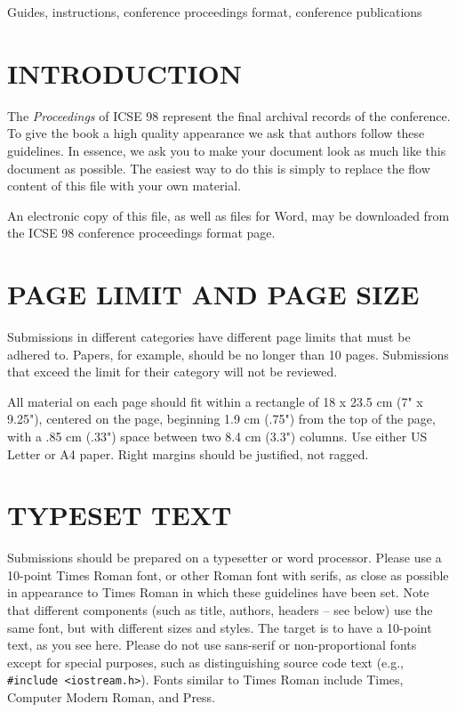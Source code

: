 \keywords
Guides, instructions, conference proceedings format, conference publications

\section{INTRODUCTION}
The {\it Proceedings} of ICSE 98 represent the final archival 
records of the conference. To give the book a high quality 
appearance we ask that authors follow these guidelines. In 
essence, we ask you to make your document look as much 
like this document as possible. The easiest way to do this is 
simply to replace the flow content of this file with your own 
material.
 
An electronic copy of this file, as well as files for Word,
 may be downloaded from the ICSE 98 conference proceedings
format page\cite{EAK}.

\section{PAGE LIMIT AND PAGE SIZE}
Submissions in different categories have different page 
limits that must be adhered to. Papers, for example, should 
be no longer than 10 pages. Submissions that exceed the 
limit for their category will not be reviewed.
 
All material on each page should fit within a rectangle of 
18 x 23.5 cm (7" x 9.25"), centered on the page, beginning 
1.9 cm (.75") from the top of the page, with a .85 cm (.33") 
space between two 8.4 cm (3.3") columns. Use either US 
Letter or A4 paper. Right margins should be justified, not 
ragged.

\section{TYPESET TEXT}
Submissions should be prepared on a typesetter or word 
processor. Please use a 10-point Times Roman font, or other 
Roman font with serifs, as close as possible in appearance to 
Times Roman in which these guidelines have been set. Note 
that different components (such as title, authors, headers -- 
see below) use the same font, but with different sizes and 
styles. The target is to have a 10-point text, as you see here. 
Please do not use sans-serif or non-proportional fonts except 
for special purposes, such as distinguishing source code text 
(e.g., \verb|#include <iostream.h>|). Fonts similar to Times 
Roman include Times, Computer Modern Roman, and Press.
 
